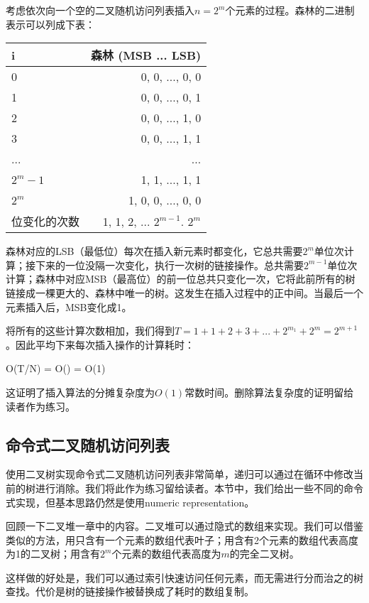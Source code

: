 \documentclass[UTF8]{article}
\begin{document}
考虑依次向一个空的二叉随机访问列表插入$n = 2^m$个元素的过程。森林的二进制表示可以列成下表：

\begin{tabular}{l | r}
  \hline
  i & 森林 (MSB ... LSB) \\
  \hline
  0 & 0, 0, ..., 0, 0 \\
  1 & 0, 0, ..., 0, 1 \\
  2 & 0, 0, ..., 1, 0 \\
  3 & 0, 0, ..., 1, 1 \\
  ... & ... \\
  $2^m-1$ & 1, 1, ..., 1, 1 \\
  $2^m$ & 1, 0, 0, ..., 0, 0 \\
  \hline
  位变化的次数 & 1, 1, 2, ... $2^{m-1}$. $2^m$ \\
  \hline
\end{tabular}

森林对应的LSB（最低位）每次在插入新元素时都变化，它总共需要$2^m$单位次计算；接下来的一位没隔一次变化，执行一次树的链接操作。总共需要$2^{m-1}$单位次计算；森林中对应MSB（最高位）的前一位总共只变化一次，它将此前所有的树链接成一棵更大的、森林中唯一的树。这发生在插入过程中的正中间。当最后一个元素插入后，MSB变化成1。

将所有的这些计算次数相加，我们得到$T = 1 + 1 + 2 + 3 + ... + 2^{m_1} + 2^m = 2^{m+1}$。因此平均下来每次插入操作的计算耗时：

\be
O(T/N) = O() = O(1)
\ee

这证明了插入算法的分摊复杂度为$O(1)$常数时间。删除算法复杂度的证明留给读者作为练习。

\subsection{命令式二叉随机访问列表}

使用二叉树实现命令式二叉随机访问列表非常简单，递归可以通过在循环中修改当前的树进行消除。我们将此作为练习留给读者。本节中，我们给出一些不同的命令式实现，但基本思路仍然是使用numeric representation。

回顾一下二叉堆一章中的内容。二叉堆可以通过隐式的数组来实现。我们可以借鉴类似的方法，用只含有一个元素的数组代表叶子；用含有2个元素的数组代表高度为1的二叉树；用含有$2^m$个元素的数组代表高度为$m$的完全二叉树。

这样做的好处是，我们可以通过索引快速访问任何元素，而无需进行分而治之的树查找。代价是树的链接操作被替换成了耗时的数组复制。
\end{document}
